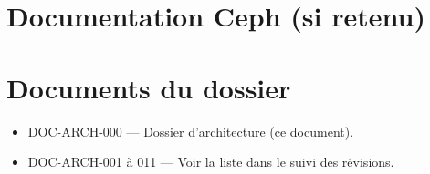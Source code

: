 \vspace{-4pt}\section*{Documentation Ceph (si retenu)}
\begin{itemize}
\end{itemize}

\vspace{-4pt}\section*{Documents du dossier}
\begin{itemize}
  \item DOC-ARCH-000 — Dossier d'architecture (ce document).
  \item DOC-ARCH-001 à 011 — Voir la liste dans le suivi des révisions.
\end{itemize}

\endgroup
